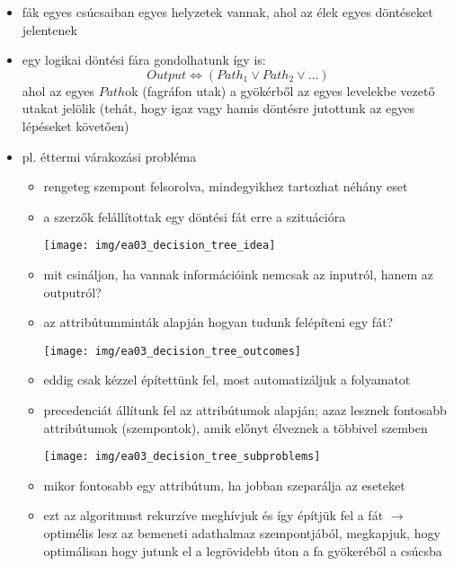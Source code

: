 \documentclass[a4paper, 11pt]{article}
\begin{document}
\begin{itemize}
	\item fák egyes csúcsaiban egyes helyzetek vannak, ahol az élek egyes döntéseket jelentenek
	\item egy logikai döntési fára gondolhatunk így is:
	\[ Output \Longleftrightarrow (Path_1 \lor Path_2 \lor \dots) \] ahol az egyes $Path$ok (fagráfon utak) a gyökérből az egyes levelekbe vezető utakat jelölik (tehát, hogy igaz vagy hamis döntésre jutottunk az egyes lépéseket követően)
	\item pl. éttermi várakozási probléma
	\begin{itemize}
		\item rengeteg szempont felsorolva, mindegyikhez tartozhat néhány eset
		\item a szerzők felállítottak egy döntési fát erre a szituációra
		
		\begin{center}
			\texttt{[image: img/ea03\_decision\_tree\_idea]}
		\end{center}
		
		\item mit csináljon, ha vannak információink nemcsak az inputról, hanem az outputról?
		\item az attribútumminták alapján hogyan tudunk felépíteni egy fát?
		\begin{center}
			\texttt{[image: img/ea03\_decision\_tree\_outcomes]}
		\end{center}
		\item eddig csak kézzel építettünk fel, most automatizáljuk a folyamatot
		\item precedenciát állítunk fel az attribútumok alapján; azaz lesznek fontosabb attribútumok (szempontok), amik előnyt élveznek a többivel szemben
		\begin{center}
			\texttt{[image: img/ea03\_decision\_tree\_subproblems]}
		\end{center}
		\item mikor fontosabb egy attribútum, ha jobban szeparálja az eseteket
		\item ezt az algoritmust rekurzíve meghívjuk és így építjük fel a fát $\to$ optimélis lesz az bemeneti adathalmaz szempontjából, megkapjuk, hogy optimálisan hogy jutunk el a legrövidebb úton a fa gyökeréből a csúcsba
		

\end{itemize}
\end{itemize}
\end{document}
